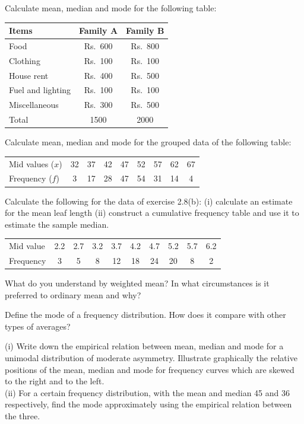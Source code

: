 \documentclass[11pt,a4paper]{article}
\begin{document}
\begin{longlist}
\item Calculate mean, median and mode for the following table:
\begin{center}
\begin{tabular}{lcc}
Items & Family A & Family B \\
\hline
Food & Rs.\ 600 & Rs.\ 800 \\
Clothing & Rs.\ 100 & Rs.\ 100 \\
House rent & Rs.\ 400 & Rs.\ 500 \\
Fuel and lighting & Rs.\ 100 & Rs.\ 100 \\
Miscellaneous & Rs.\ 300 & Rs.\ 500 \\
\hline
Total & 1500 & 2000
\end{tabular}
\end{center}

\item Calculate mean, median and mode for the grouped data of the following table:
\begin{center}
\begin{tabular}{l|cccccccc}
Mid values ($x$) & 32 & 37 & 42 & 47 & 52 & 57 & 62 & 67 \\
Frequency ($f$) & 3 & 17 & 28 & 47 & 54 & 31 & 14 & 4
\end{tabular}
\end{center}

\item Calculate the following for the data of exercise 2.8(b): (i) calculate an estimate for the mean leaf length (ii) construct a cumulative frequency table and use it to estimate the sample median.
\begin{center}
\begin{tabular}{l|ccccccccc}
Mid value & 2.2 & 2.7 & 3.2 & 3.7 & 4.2 & 4.7 & 5.2 & 5.7 & 6.2 \\
Frequency & 3 & 5 & 8 & 12 & 18 & 24 & 20 & 8 & 2
\end{tabular}
\end{center}

\item What do you understand by weighted mean? In what circumstances is it preferred to ordinary mean and why?

\item Define the mode of a frequency distribution. How does it compare with other types of averages?

\item [26.] (i) Write down the empirical relation between mean, median and mode for a unimodal distribution of moderate asymmetry. Illustrate graphically the relative positions of the mean, median and mode for frequency curves which are skewed to the right and to the left.\\
(ii) For a certain frequency distribution, with the mean and median 45 and 36 respectively, find the mode approximately using the empirical relation between the three.


\end{longlist}
\end{document}
